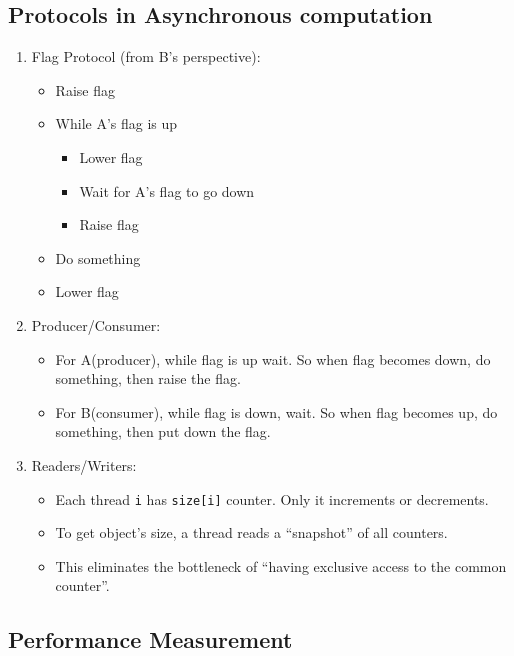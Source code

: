 \documentclass[twocolumn,landscape,10pt]{article}
\theoremstyle{definition}
\begin{document}
\subsection{Protocols in Asynchronous computation}

\begin{enumerate}
    \item Flag Protocol (from B's perspective):
        \begin{itemize}
            \item Raise flag
            \item While A's flag is up
                \begin{itemize}
                    \item Lower flag
                    \item Wait for A's flag to go down
                    \item Raise flag
                \end{itemize} 
            \item Do something
            \item Lower flag
        \end{itemize} 
    \item Producer/Consumer:
        \begin{itemize}
            \item For A(producer), while flag is up wait. So when flag becomes down,
                do something, then raise the flag.
            \item For B(consumer), while flag is down, wait. So when flag
                becomes up, do something, then put down the flag.
        \end{itemize} 
    \item Readers/Writers:
        \begin{itemize}
            \item Each thread \texttt{i} has \texttt{size[i]} counter. Only it
                increments or decrements.
            \item To get object's size, a thread reads a ``snapshot'' of all
                counters.
            \item This eliminates the bottleneck of ``having exclusive access to
                the common counter''.
        \end{itemize} 
\end{enumerate} 

\subsection{Performance Measurement}
\end{document}
